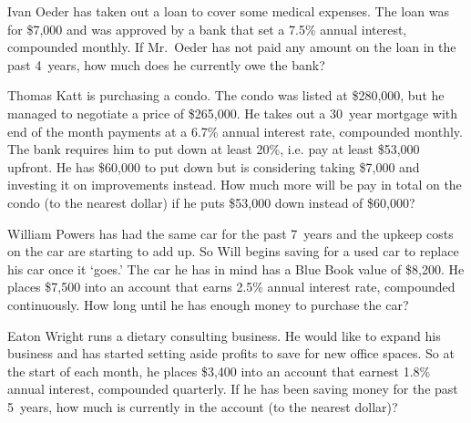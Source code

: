 \documentclass[12pt,letterpaper]{exam}
\begin{document}
\begin{questions}
\newpage
\question[10] Ivan Oeder has taken out a loan to cover some medical expenses. The loan was for \$7,000 and was approved by a bank that set a 7.5\% annual interest, compounded monthly. If Mr.~Oeder has not paid any amount on the loan in the past 4~years, how much does he currently owe the bank?



\newpage
\question[10] Thomas Katt is purchasing a condo. The condo was listed at \$280,000, but he managed to negotiate a price of \$265,000. He takes out a 30~year mortgage with end of the month payments at a 6.7\% annual interest rate, compounded monthly. The bank requires him to put down at least 20\%, i.e. pay at least \$53,000 upfront. He has \$60,000 to put down but is considering taking \$7,000 and investing it on improvements instead. How much more will be pay in total on the condo (to the nearest dollar) if he puts \$53,000 down instead of \$60,000?



\newpage
\question[10] William Powers has had the same car for the past 7~years and the upkeep costs on the car are starting to add up. So Will begins saving for a used car to replace his car once it `goes.' The car he has in mind has a Blue Book value of \$8,200. He places \$7,500 into an account that earns 2.5\% annual interest rate, compounded continuously. How long until he has enough money to purchase the car?



\newpage
\question[10] Eaton Wright runs a dietary consulting business. He would like to expand his business and has started setting aside profits to save for new office spaces. So at the start of each month, he places \$3,400 into an account that earnest 1.8\% annual interest, compounded quarterly. If he has been saving money for the past 5~years, how much is currently in the account (to the nearest dollar)?


\end{questions}
\end{document}
